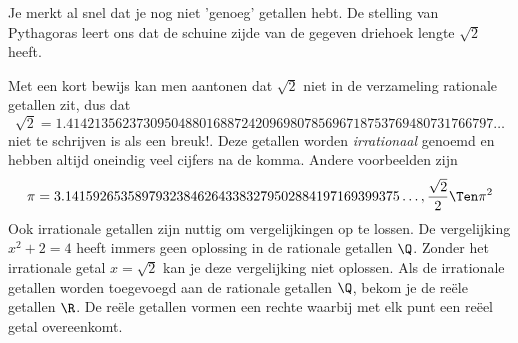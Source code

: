 \documentclass{ximera}
\begin{document}
Je merkt al snel dat je nog niet 'genoeg' getallen hebt. 
De stelling van Pythagoras 
leert ons dat de schuine zijde van de gegeven driehoek lengte \( \sqrt{2}\) heeft. 


\begin{figure} 
\end{figure}
    
Met een kort bewijs kan men aantonen dat \(\sqrt{2}\) niet in de verzameling rationale getallen zit, dus dat 
\[\sqrt{2} = 1.4142135623730950488016887242096980785696718753769480731766797\ldots%
\]  
niet te schrijven is als een breuk!. 
Deze getallen worden \textit{irrationaal} genoemd en hebben altijd oneindig veel cijfers na de komma.
%
Andere voorbeelden zijn 
\[ \pi = 3.141592653589793238462643383279502884197169399375\ldots%
,
\frac{\sqrt{2}}{2}
\Ten \pi^2 
\]
%
Ook irrationale getallen zijn nuttig om vergelijkingen op te lossen. 
De vergelijking \(x^2 + 2 = 4\) heeft immers geen oplossing in de rationale getallen \( \Q \).
Zonder het irrationale getal \(x = \sqrt{2} \) kan je deze vergelijking niet oplossen.
Als de irrationale getallen worden toegevoegd aan de rationale getallen \(\Q\), bekom je de reële getallen \(\R\). 
De reële getallen vormen een rechte waarbij met elk punt een reëel getal overeenkomt. 



    
    
\end{document}
